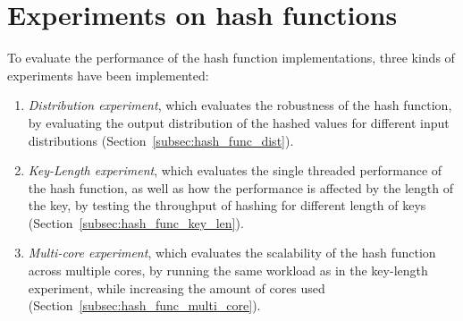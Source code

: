 \documentclass[11pt]{report} %
\begin{document}
\section{Experiments on hash functions}
\label{sec:hash_func_experiments}
To evaluate the performance of the hash function implementations, three kinds of experiments have been implemented:
\begin{enumerate}[noitemsep]
  \item \emph{Distribution experiment}, which evaluates the robustness of the hash function, by evaluating the output distribution of the hashed values for different input distributions (Section~\ref{subsec:hash_func_dist}). 
  \item \emph{Key-Length experiment}, which evaluates the single threaded performance of the hash function, as well as how the performance is affected by the length of the key, by testing the throughput of hashing for different length of keys (Section~\ref{subsec:hash_func_key_len}).
  \item \emph{Multi-core experiment}, which evaluates the scalability of the hash function across multiple cores, by running the same workload as in the key-length experiment, while increasing the amount of cores used (Section~\ref{subsec:hash_func_multi_core}). 
\end{enumerate}
\end{document}

